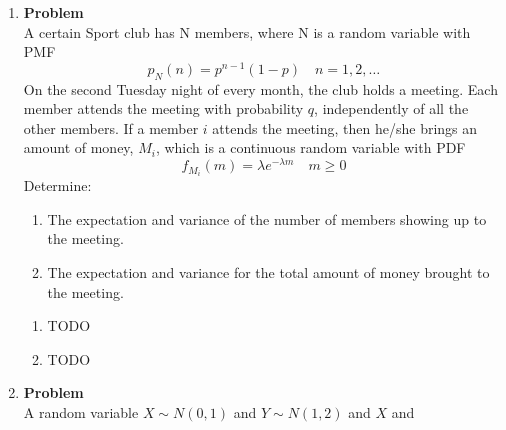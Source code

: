 \documentclass[12pt]{article}
\newenvironment{Ex}{\textbf{Problem}\vspace{.75em}\\}{}
\begin{document}
\begin{enumerate}
\begin{Ex}
\begin{solution}
\begin{tabularx}{.95\textwidth}{XX}
\begin{equation}
\begin{aligned}
            \text{Var}(H|D) &= \text{Var}(H) \\
            &= 0.25(E[D^2] - E[D]^2) \\
            &= 0.25(91/6 - 3.5^2) \\
            \text{Var}(H) &= 0.7292 \\
          \end{aligned}
        \end{equation}
      \end{tabularx}
    \end{solution}
  \end{Ex}
\item
  \begin{Ex}
    A certain Sport club has N members, where N is a random variable
    with PMF
    \begin{equation}
      \label{eq:4-question-0}
      p_N(n) = p^{n-1}(1-p) \quad n=1,2,\ldots
    \end{equation}
    On the second Tuesday night of every month, the club holds a
    meeting. Each member attends the meeting with probability $q$,
    independently of all the other members. If a member $i$ attends
    the meeting, then he/she brings an amount of money, $M_i$, which is a
    continuous random variable with PDF
    \begin{equation}
      \label{eq:4-question-1}
      f_{M_{i}}(m) = \lambda e^{-\lambda m}\quad m\ge0
    \end{equation}
    Determine:
    \begin{enumerate}
    \item The expectation and variance of the number of members
      showing up to the meeting.
    \item The expectation and variance for the total amount of money
      brought to the meeting.
    \end{enumerate}
    \begin{solution} \hfill
      \begin{enumerate}
      \item {\color{red} \huge TODO}
      \item {\color{red} \huge TODO}
      \end{enumerate}
    \end{solution}
  \end{Ex}
\item
  \begin{Ex}
    A random variable $X \sim N(0,1)$ and $Y \sim N(1,2)$ and $X$ and

\end{Ex}
\end{enumerate}
\end{document}
